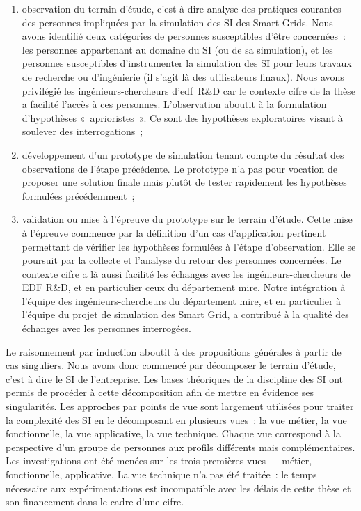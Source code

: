 \begin{enumerate}
	\item observation du terrain d'étude, c'est à dire analyse des pratiques 
courantes des personnes impliquées par la simulation des SI des Smart Grids. Nous avons identifié deux 
catégories de personnes susceptibles d'être concernées~: les personnes appartenant au domaine du SI (ou 
de sa simulation), et les personnes susceptibles d'instrumenter la simulation des SI 
pour leurs travaux de recherche ou d'ingénierie (il s'agit là des utilisateurs 
finaux). Nous avons privilégié les ingénieurs-chercheurs d'\gls{edf}~R\&D car le 
contexte \gls{cifre} de la thèse a facilité l'accès à ces 
personnes. L'observation aboutit à la formulation d'hypothèses «~aprioristes~». 
Ce sont des hypothèses exploratoires visant à soulever des interrogations~;

	
	\item développement d'un prototype de simulation tenant compte du résultat des 
observations de l'étape précédente. Le prototype n'a pas pour vocation de 
proposer une solution finale mais plutôt de tester rapidement les hypothèses 
formulées précédemment~;
	
	\item validation ou mise à l'épreuve du prototype sur le terrain d'étude. Cette 
mise à l'épreuve commence par la définition d'un cas d'application pertinent 
permettant de vérifier les hypothèses formulées à l'étape d'observation. Elle se 
poursuit par la collecte et l'analyse du retour des personnes concernées. Le 
contexte \gls{cifre} a là aussi facilité les échanges avec les 
ingénieurs-chercheurs de EDF R\&D, et en particulier ceux du département 
\gls{mire}. Notre intégration à l'équipe des ingénieurs-chercheurs du département 
\gls{mire}, et en particulier à l'équipe du projet de simulation des Smart Grid, 
a contribué à la qualité des échanges avec les personnes interrogées.
	
\end{enumerate}
		
Le raisonnement par induction aboutit à des propositions générales à partir de 
cas singuliers. Nous avons donc commencé par décomposer le terrain d'étude, 
c'est à dire le SI de l'entreprise. Les bases théoriques de la discipline des SI 
ont permis de procéder à cette décomposition afin de mettre en évidence ses 
singularités. Les approches par points de vue sont largement utilisées pour 
traiter la complexité des SI en le décomposant en plusieurs vues~: la vue 
métier, la vue fonctionnelle, la vue applicative, la vue technique. Chaque vue 
correspond à la perspective d'un groupe de personnes aux profils différents mais 
complémentaires. Les investigations ont été menées sur les trois premières vues — 
métier, fonctionnelle, applicative. La vue technique n'a pas été traitée~: le 
temps nécessaire aux expérimentations est incompatible avec les délais de cette 
thèse et son financement dans le cadre d'une \gls{cifre}.
	
